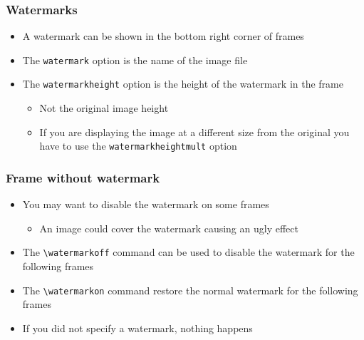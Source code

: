 \begin{frame}[t,fragile]
\frametitle{Watermarks}
\begin{itemize}
\item A watermark can be shown in the bottom right corner of frames
\item The \verb!watermark! option is the name of the image file
\item The \verb!watermarkheight! option is the height of the watermark in the frame
  \begin{itemize}
  \item Not the original image height
  \item If you are displaying the image at a different size from the original you
        have to use the \verb!watermarkheightmult! option
  \end{itemize}
\end{itemize}

\end{frame}

\watermarkoff
\begin{frame}[t,fragile]
\frametitle{Frame without watermark}

\begin{itemize}
\item You may want to disable the watermark on some frames
  \begin{itemize}
  \item An image could cover the watermark causing an ugly effect
  \end{itemize}
\item The \verb!\watermarkoff! command can be used to disable the watermark for the following frames
\item The \verb!\watermarkon! command restore the normal watermark for the following frames
\item If you did not specify a watermark, nothing happens
\end{itemize}

\end{frame}
\watermarkon
